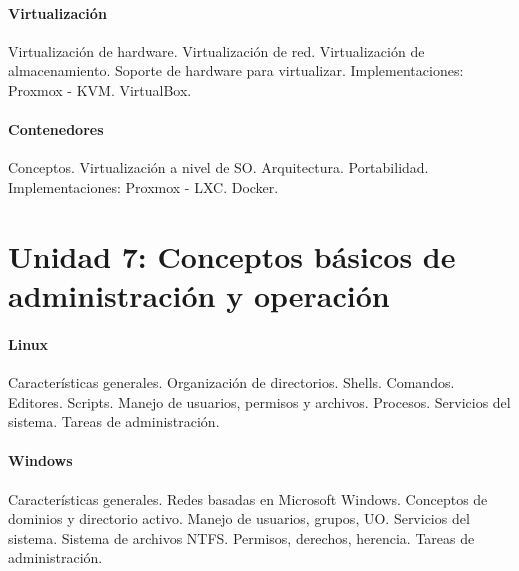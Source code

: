 \paragraph*{Virtualización} Virtualización de hardware. Virtualización de red. Virtualización de almacenamiento. Soporte de hardware para virtualizar. Implementaciones: Proxmox - KVM. VirtualBox.

\paragraph*{Contenedores} Conceptos. Virtualización a nivel de SO. Arquitectura. Portabilidad. Implementaciones: Proxmox - LXC. Docker.

\section*{Unidad 7: Conceptos básicos de administración y operación}

\paragraph*{Linux} Características generales. Organización de directorios. Shells. Comandos. Editores. Scripts. Manejo de usuarios, permisos y archivos. Procesos. Servicios del sistema. Tareas de administración.

\paragraph*{Windows} Características generales. Redes basadas en Microsoft Windows. Conceptos de dominios y directorio activo. Manejo de usuarios, grupos, UO. Servicios del sistema. Sistema de archivos NTFS. Permisos, derechos, herencia. Tareas de administración.

